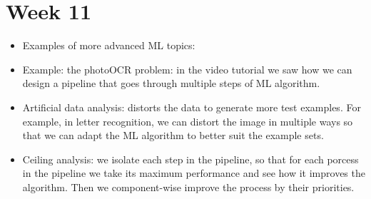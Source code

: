 \documentclass[12pt]{article}
\begin{document}
\section*{Week 11}
\begin{itemize}
	\item Examples of more advanced ML topics:
	\item Example: the photoOCR problem: in the video tutorial we saw how we can design a pipeline that goes through multiple steps of ML algorithm.
	\item Artificial data analysis: distorts the data to generate more test examples. For example, in letter recognition, we can distort the image in multiple ways so that we can adapt the ML algorithm to better suit the example sets.
	\item Ceiling analysis: we isolate each step in the pipeline, so that for each porcess in the pipeline we take its maximum performance and see how it improves the algorithm. Then we component-wise improve the process by their priorities.
\end{itemize}
\end{document}
